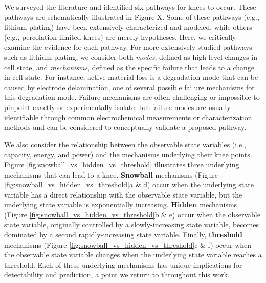 \documentclass{article}
\begin{document}
We surveyed the literature and identified six pathways for knees to occur. These pathways are schematically illustrated in Figure X. Some of these pathways (e.g., lithium plating) have been extensively characterized and modeled, while others (e.g., percolation-limited knees) are merely hypotheses. Here, we critically examine the evidence for each pathway. For more extensively studied pathways such as lithium plating, we consider both \textit{modes}, defined as high-level changes in cell state, and \textit{mechanisms}, defined as the specific failure that leads to a change in cell state. For instance, active material loss is a degradation mode that can be caused by electrode delamination, one of several possible failure mechanisms for this degradation mode. Failure mechanisms are often challenging or impossible to pinpoint exactly or experimentally isolate, but failure modes are usually identifiable through common electrochemical measurements or characterization methods and can be considered to conceptually validate a proposed pathway.

We also consider the relationship between the observable state variables (i.e., capacity, energy, and power) and the mechanisms underlying their knee points. Figure \ref{fig:snowball_vs_hidden_vs_threshold} illustrates three underlying mechanisms that can lead to a knee. \textbf{Snowball} mechanisms (Figure \ref{fig:snowball_vs_hidden_vs_threshold}a \& d) occur when the underlying state variable has a direct relationship with the observable state variable, but the underlying state variable is exponentially increasing. \textbf{Hidden} mechanisms (Figure \ref{fig:snowball_vs_hidden_vs_threshold}b \& e) occur when the observable state variable, originally controlled by a slowly-increasing state variable, becomes dominated by a second rapidly-increasing state variable. Finally, \textbf{threshold} mechanisms (Figure \ref{fig:snowball_vs_hidden_vs_threshold}c \& f) occur when the observable state variable changes when the underlying state variable reaches a threshold. Each of these underlying mechanisms has unique implications for detectability and prediction, a point we return to throughout this work.
\end{document}
